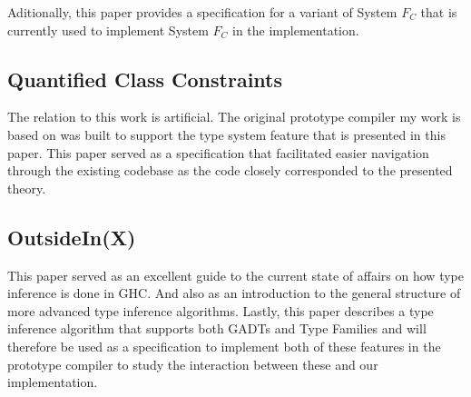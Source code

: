 Aditionally, this paper provides a specification for a variant of System $F_C$
that is currently used to implement System $F_C$ in the implementation.

\subsection{Quantified Class Constraints\cite{Bottu:2017:QCC:3156695.3122967}}

The relation to this work is artificial. The original prototype compiler my work
is based on was built to support the type system feature that is presented in
this paper. This paper served as a specification that facilitated easier
navigation through the existing codebase as the code closely corresponded to the
presented theory.

\subsection{OutsideIn(X)\cite{outsideinx-modular-type-inference-with-local-assumptions}}

This paper served as an excellent guide to the current state of affairs on how
type inference is done in GHC. And also as an introduction to the general
structure of more advanced type inference algorithms. Lastly, this paper
describes a type inference algorithm that supports both GADTs and Type Families
and will therefore be used as a specification to implement both of these
features in the prototype compiler to study the interaction between these and
our implementation.

